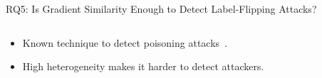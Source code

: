 

\begin{frame}{RQ5: Is Gradient Similarity Enough to Detect Label-Flipping Attacks?}

  \begin{columns}
    \begin{column}{.45\textwidth}
      \begin{itemize}[<+->]
        \item Known technique to detect poisoning attacks~\autocite{tolpegin_DataPoisoningAttacks_2020}.
        \item High heterogeneity makes it harder to detect attackers.
      \end{itemize}
    \end{column}

  \end{columns}


\end{frame}

